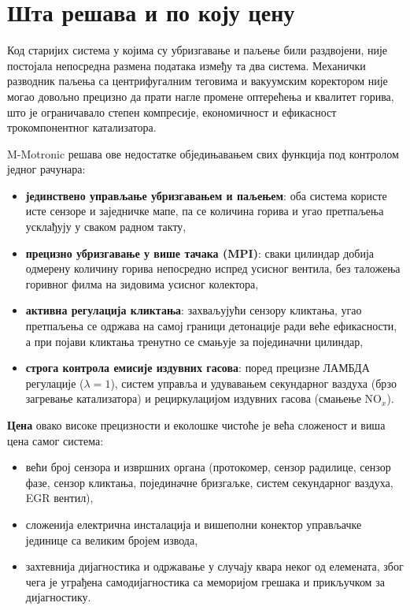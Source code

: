 \documentclass[12pt]{article}
\begin{document}
\section{Шта решава и по коју цену}

Код старијих система у којима су убризгавање и паљење били раздвојени, није
постојала непосредна размена података између та два система. Механички
разводник паљења са центрифугалним теговима и вакуумским коректором није могао
довољно прецизно да прати нагле промене оптерећења и квалитет горива, што је
ограничавало степен компресије, економичност и ефикасност трокомпонентног
катализатора.

M-Motronic решава ове недостатке обједињавањем свих функција под контролом
једног рачунара:

\begin{itemize}[noitemsep]
    \item \textbf{јединствено управљање убризгавањем и паљењем}: оба система
          користе исте сензоре и заједничке мапе, па се количина горива и угао
          претпаљења усклађују у сваком радном такту,
    \item \textbf{прецизно убризгавање у више тачака (MPI)}: сваки цилиндар
          добија одмерену количину горива непосредно испред усисног вентила,
          без таложења горивног филма на зидовима усисног колектора,
    \item \textbf{активна регулација кликтања}: захваљујући сензору кликтања,
          угао претпаљења се одржава на самој граници детонације ради веће
          ефикасности, а при појави кликтања тренутно се смањује за
          појединачни цилиндар,
    \item \textbf{строга контрола емисије издувних гасова}: поред прецизне
          ЛАМБДА регулације ($\lambda = 1$), систем управља и удувавањем
          секундарног ваздуха (брзо загревање катализатора) и рециркулацијом
          издувних гасова (смањење $\text{NO}_x$).
\end{itemize}

\textbf{Цена} овако високе прецизности и еколошке чистоће је већа сложеност
и виша цена самог система:

\begin{itemize}[noitemsep]
    \item већи број сензора и извршних органа (протокомер, сензор радилице,
          сензор фазе, сензор кликтања, појединачне бризгаљке, систем
          секундарног ваздуха, EGR вентил),
    \item сложенија електрична инсталација и вишеполни конектор управљачке
          јединице са великим бројем извода,
    \item захтевнија дијагностика и одржавање у случају квара неког од
          елемената, због чега је уграђена самодијагностика са меморијом
          грешака и прикључком за дијагностику.
\end{itemize}
\end{document}
